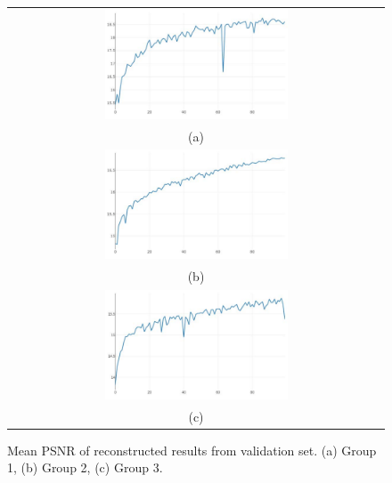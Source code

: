 \documentclass[10pt,twocolumn,letterpaper]{article}
\begin{document}
\begin{figure}%
\centering\begin{tabular}{c}
\includegraphics[width=0.5\textwidth]{fig23-a}\\
(a)\\[3ex]%
\includegraphics[width=0.5\textwidth]{fig23-b}\\
(b)\\[3ex]
\includegraphics[width=0.5\textwidth]{fig23-c}\\
(c)
\end{tabular}
\caption{Mean PSNR of reconstructed results from validation set. (a) Group 1, (b) Group 2, (c) Group 3.}%
\label{fig23}%
\end{figure}
\end{document}
